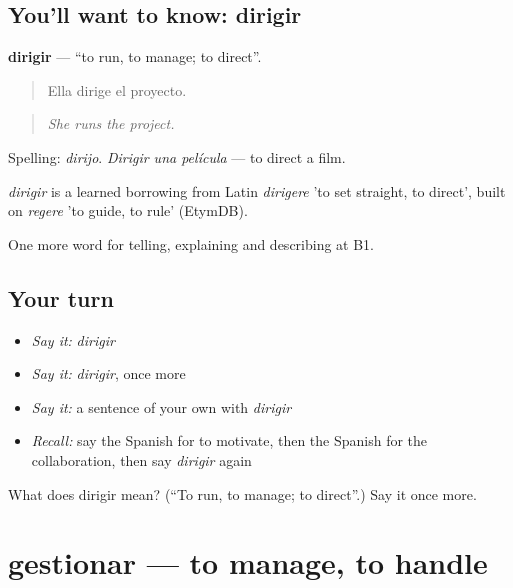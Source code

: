 \subsection*{You'll want to know: dirigir}
\textbf{dirigir} — \textquotedblleft{}to run, to manage; to direct\textquotedblright{}.

\begin{quote}
Ella dirige el proyecto.
\end{quote}

\begin{quote}
\emph{She runs the project.}
\end{quote}

Spelling: \emph{dirijo}. \emph{Dirigir una película} — to direct a film.

\begin{cousinweb}
\emph{dirigir} is a learned borrowing from Latin \emph{dirigere} 'to set straight, to direct', built on \emph{regere} 'to guide, to rule' (EtymDB).
\end{cousinweb}

\begin{grammarlens}[title={What you've built}]
One more word for telling, explaining and describing at B1.
\end{grammarlens}

\subsection*{Your turn}
\begin{itemize}
\raggedright
  \item \emph{Say it:} \emph{dirigir}
  \item \emph{Say it:} \emph{dirigir}, once more
  \item \emph{Say it:} a sentence of your own with \emph{dirigir}
  \item \emph{Recall:} say the Spanish for to motivate, then the Spanish for the collaboration, then say \emph{dirigir} again
\end{itemize}

\begin{tcolorbox}[breakable,colback=teal!4,colframe=teal!35!black,title={Before you move on}]
What does dirigir mean? (\textquotedblleft{}To run, to manage; to direct\textquotedblright{}.) Say it once more.
\end{tcolorbox}
\section[gestionar]{gestionar — to manage, to handle}

